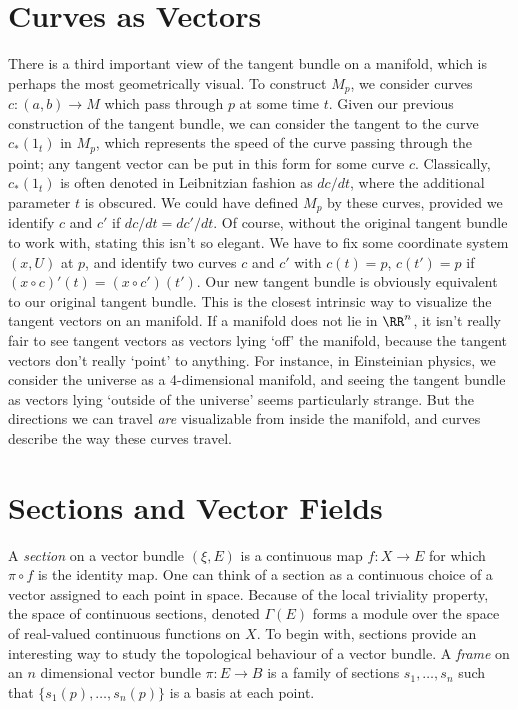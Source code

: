 \section{Curves as Vectors}

There is a third important view of the tangent bundle on a manifold, which is perhaps the most geometrically visual. To construct $M_p$, we consider curves $c: (a,b) \to M$ which pass through $p$ at some time $t$. Given our previous construction of the tangent bundle, we can consider the tangent to the curve $c_*(1_t)$ in $M_p$, which represents the speed of the curve passing through the point; any tangent vector can be put in this form for some curve $c$. Classically, $c_*(1_t)$ is often denoted in Leibnitzian fashion as $dc/dt$, where the additional parameter $t$ is obscured. We could have defined $M_p$ by these curves, provided we identify $c$ and $c'$ if $dc/dt = dc'/dt$. Of course, without the original tangent bundle to work with, stating this isn't so elegant. We have to fix some coordinate system $(x,U)$ at $p$, and identify two curves $c$ and $c'$ with $c(t) = p$, $c(t') = p$ if $(x \circ c)'(t) = (x \circ c')(t')$. Our new tangent bundle is obviously equivalent to our original tangent bundle. This is the closest intrinsic way to visualize the tangent vectors on an manifold. If a manifold does not lie in $\RR^n$, it isn't really fair to see tangent vectors as vectors lying `off' the manifold, because the tangent vectors don't really `point' to anything. For instance, in Einsteinian physics, we consider the universe as a 4-dimensional manifold, and seeing the tangent bundle as vectors lying `outside of the universe' seems particularly strange. But the directions we can travel {\it are} visualizable from inside the manifold, and curves describe the way these curves travel.

\section{Sections and Vector Fields}

A \emph{section} on a vector bundle $(\xi,E)$ is a continuous map $f:X \to E$ for which $\pi \circ f$ is the identity map. One can think of a section as a continuous choice of a vector assigned to each point in space. Because of the local triviality property, the space of continuous sections, denoted $\Gamma(E)$ forms a module over the space of real-valued continuous functions on $X$. To begin with, sections provide an interesting way to study the topological behaviour of a vector bundle. A \emph{frame} on an $n$ dimensional vector bundle $\pi: E \to B$ is a family of sections $s_1, \dots, s_n$ such that $\{ s_1(p), \dots, s_n(p) \}$ is a basis at each point.

